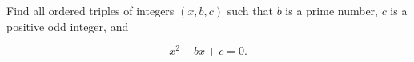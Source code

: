 Find all ordered triples of integers $(x,b,c)$ such that $b$ is a prime number, $c$ is a positive odd integer, and

\[
x^2 + bx + c = 0.
\]
